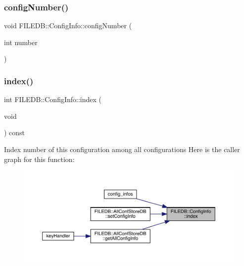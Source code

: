 \mbox{\label{classFILEDB_1_1ConfigInfo_a226c79a0ee78d03894cfb6b7ed207992}} 
\subsubsection{\texorpdfstring{configNumber()}{configNumber()}\hspace{0.1cm}{\footnotesize\ttfamily [4/4]}}
{\footnotesize\ttfamily void F\+I\+L\+E\+D\+B\+::\+Config\+Info\+::config\+Number (\begin{DoxyParamCaption}\item[{int}]{number }\end{DoxyParamCaption})}

\mbox{\label{classFILEDB_1_1ConfigInfo_a1ea886d3469211d480bf2c26d474c365}} 
\subsubsection{\texorpdfstring{index()}{index()}\hspace{0.1cm}{\footnotesize\ttfamily [1/4]}}
{\footnotesize\ttfamily int F\+I\+L\+E\+D\+B\+::\+Config\+Info\+::index (\begin{DoxyParamCaption}\item[{void}]{ }\end{DoxyParamCaption}) const}

Index number of this configuration among all configurations Here is the caller graph for this function\+:\nopagebreak
\begin{figure}[H]
\begin{center}
\leavevmode
\includegraphics[width=350pt]{d0/d90/classFILEDB_1_1ConfigInfo_a1ea886d3469211d480bf2c26d474c365_icgraph}
\end{center}
\end{figure}
\mbox{\label{classFILEDB_1_1ConfigInfo_a1ea886d3469211d480bf2c26d474c365}} 
